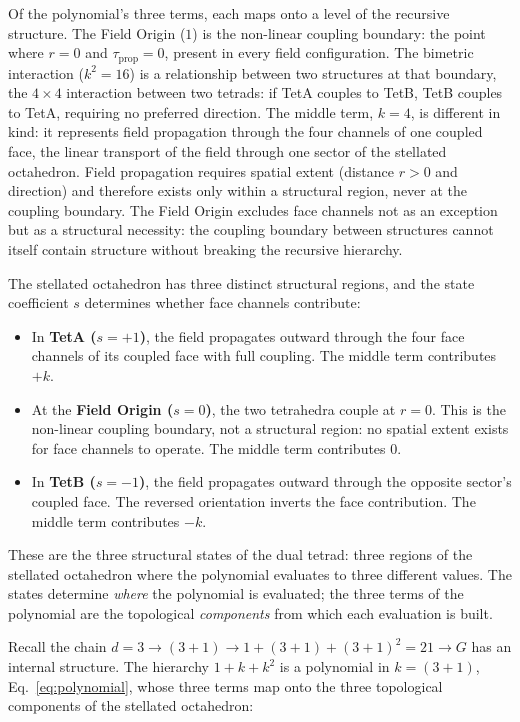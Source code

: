 \documentclass[aps,prd,preprint,superscriptaddress,showpacs,preprintnumbers,amsmath,amssymb,nofootinbib]{revtex4-2}
\begin{document}
Of the polynomial's three terms, each maps onto a level of the recursive structure. The Field Origin ($1$) is the non-linear coupling boundary: the point where $r = 0$ and $\tau_{\text{prop}} = 0$, present in every field configuration. The bimetric interaction ($k^2 = 16$) is a relationship between two structures at that boundary, the $4 \times 4$ interaction between two tetrads: if TetA couples to TetB, TetB couples to TetA, requiring no preferred direction. The middle term, $k = 4$, is different in kind: it represents field propagation through the four channels of one coupled face, the linear transport of the field through one sector of the stellated octahedron. Field propagation requires spatial extent (distance $r > 0$ and direction) and therefore exists only within a structural region, never at the coupling boundary. The Field Origin excludes face channels not as an exception but as a structural necessity: the coupling boundary between structures cannot itself contain structure without breaking the recursive hierarchy.

The stellated octahedron has three distinct structural regions, and the state coefficient $s$ determines whether face channels contribute:

\begin{itemize}
\item In \textbf{TetA ($s = +1$)}, the field propagates outward through the four face channels of its coupled face with full coupling. The middle term contributes $+k$.
\item At the \textbf{Field Origin ($s = 0$)}, the two tetrahedra couple at $r = 0$. This is the non-linear coupling boundary, not a structural region: no spatial extent exists for face channels to operate. The middle term contributes $0$.
\item In \textbf{TetB ($s = -1$)}, the field propagates outward through the opposite sector's coupled face. The reversed orientation inverts the face contribution. The middle term contributes $-k$.
\end{itemize}

These are the three structural states of the dual tetrad: three regions of the stellated octahedron where the polynomial evaluates to three different values. The states determine \emph{where} the polynomial is evaluated; the three terms of the polynomial are the topological \emph{components} from which each evaluation is built.

Recall the chain $d = 3 \to (3{+}1) \to 1 + (3{+}1) + (3{+}1)^2 = 21 \to G$ has an internal structure. The hierarchy $1 + k + k^2$ is a polynomial in $k = (3{+}1)$, Eq.~\eqref{eq:polynomial}, whose three terms map onto the three topological components of the stellated octahedron:
\end{document}
